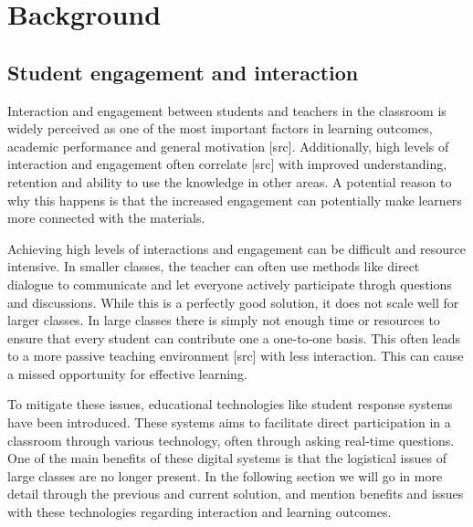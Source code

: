 \chapter{Background}\label{chap:background}


\section{Student engagement and interaction}


Interaction and engagement between students and teachers in the classroom is widely perceived as one of the most important factors in learning outcomes, academic performance and general motivation [src]. Additionally, high levels of interaction and engagement often correlate [src] with improved understanding, retention and ability to use the knowledge in other areas. A potential reason to why this happens is that the increased engagement can potentially make learners more connected with the materials. 

Achieving high levels of interactions and engagement can be difficult and resource intensive. In smaller classes, the teacher can often use methods like direct dialogue to communicate and let everyone actively participate throgh questions and discussions. While this is a perfectly good solution, it does not scale well for larger classes. In large classes there is simply not enough time or resources to ensure that every student can contribute one a one-to-one basis. This often leads to a more passive teaching environment [src] with less interaction. This can cause a missed opportunity for effective learning. 

To mitigate these issues, educational technologies like student response systems have been introduced. These systems aims to facilitate direct participation in a classroom through various technology, often through asking real-time questions. One of the main benefits of these digital systems is that the logistical issues of large classes are no longer present. In the following section we will go in more detail through the previous and current solution, and mention benefits and issues with these technologies regarding interaction and learning outcomes. 


